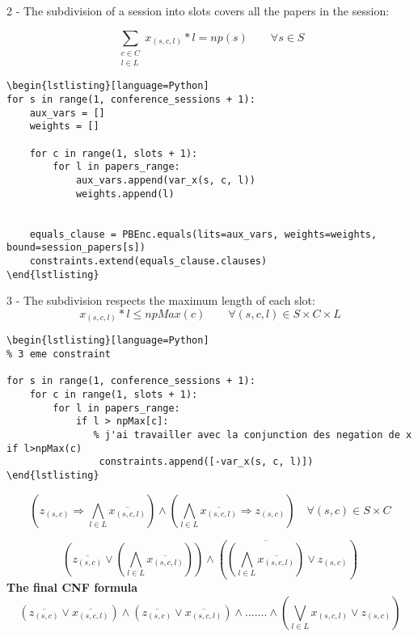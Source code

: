 \documentclass{article}
\begin{document}
2 - The subdivision of a session into slots covers all the papers in the session:


$$ \sum_{\substack{c\in C\\ l\in L}} x_{(s,c,l)}*l  = np(s)   \qquad \forall s\in S$$

\begin{verbatim}
\begin{lstlisting}[language=Python]
for s in range(1, conference_sessions + 1):
    aux_vars = []  
    weights = []   

    for c in range(1, slots + 1):
        for l in papers_range:
            aux_vars.append(var_x(s, c, l))
            weights.append(l)  

   
    equals_clause = PBEnc.equals(lits=aux_vars, weights=weights, bound=session_papers[s])
    constraints.extend(equals_clause.clauses)
\end{lstlisting}
\end{verbatim}

3 - The subdivision respects the maximum length of each slot:
$$ x_{(s,c,l)}*l \leq npMax(c)\qquad \forall (s,c,l)\in S\times C\times L $$

\begin{verbatim}
\begin{lstlisting}[language=Python]
% 3 eme constraint

for s in range(1, conference_sessions + 1):
    for c in range(1, slots + 1):
        for l in papers_range:
            if l > npMax[c]:
               % j'ai travailler avec la conjunction des negation de x if l>npMax(c)
                constraints.append([-var_x(s, c, l)])
\end{lstlisting}
\end{verbatim}

$$ \left( z_{(s,c)} \Longrightarrow \bigwedge_{l\in L} \overline{x_{(s,c,l)}} \right) \wedge \left( \bigwedge_{l\in L} \overline{x_{(s,c,l)}} \Longrightarrow z_{(s,c)} \right) \quad \forall (s,c)\in S\times C $$

$$\left(\overline{z_{(s,c)}} \vee \left(\bigwedge_{l\in L} \overline{x_{(s,c,l)}}\right) \right)\wedge \left( \overline{\left(\bigwedge_{l\in L} \overline{x_{(s,c,l)}}\right)} \vee z_{(s,c)} \right)  $$
\textbf{The final CNF formula}\\
$$\left(\overline{z_{(s,c)}} \vee \overline{x_{(s,c,l)}}\right)
 \wedge \left(\overline{z_{(s,c)}} \vee \overline{x_{(s,c,l)}}\right)\wedge ....... \wedge \left(\bigvee_{l\in L} x_{(s,c,l)} \vee z_{(s,c)}\right)$$
 
\end{document}
